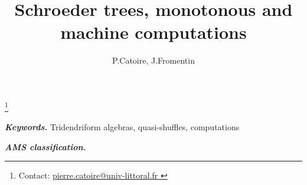 \documentclass[english]{article}
\theoremstyle{definition}
\theoremstyle{plain}
\newcommand{\Sch}{Schroeder}
\providecommand{\keywords}[1]{\textbf{\textit{Keywords.}} #1}
\providecommand{\AMSclass}[1]{\textbf{\textit{AMS classification.}} #1}
\begin{document}
\title{{\bfseries \Sch{} trees, monotonous  and machine computations}}
\author{P.Catoire, J.Fromentin}
	\thanks{Contact: \href{mailto: pierre.catoire@univ-littoral.fr; 
		}
	{pierre.catoire@univ-littoral.fr
}}


\maketitle
\begin{abstract}
\end{abstract}
\keywords
{
	Tridendriform algebras, quasi-shuffles, computations
}

\AMSclass{%
}

\tableofcontents





\end{document}
